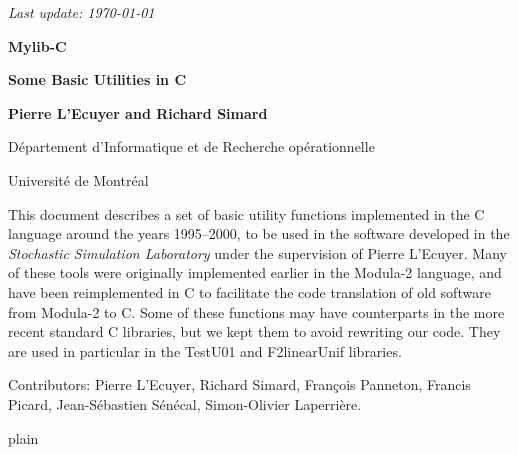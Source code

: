\documentclass[12pt]{article}
\begin{document}
\begin{titlepage}

\null 
\begin {flushright} \it Last update: \today \end {flushright}

\vfill
{ \centerline {\Large\bf Mylib-C }\bigskip\bigskip
  \centerline {\large\bf Some Basic Utilities in C }}
\vfill

\centerline {{\bf Pierre L'Ecuyer and Richard Simard}}
\medskip
\centerline {D\'epartement d'Informatique et de Recherche op\'erationnelle}
\centerline {Universit\'e de Montr\'eal}

\vfill
\medskip

This document describes a set of basic utility functions implemented in the 
C language around the years 1995--2000, to be used in the software developed in the
\emph{Stochastic Simulation Laboratory} under the supervision of Pierre L'Ecuyer.
Many of these tools were originally implemented earlier in the Modula-2 language,
and have been reimplemented in C to facilitate the code translation of old 
software from Modula-2 to C.  Some of these functions may have counterparts in
the more recent standard C libraries, but we kept them to avoid rewriting our code.
They are used in particular in the TestU01 and F2linearUnif libraries.

Contributors:  Pierre L'Ecuyer, Richard Simard, Fran\c cois Panneton,
Francis Picard, Jean-S\'ebastien S\'en\'ecal, Simon-Olivier Laperri\`ere.

\vfill
\end{titlepage}

\tableofcontents
{}

\iffalse 













\fi


\clearpage
\clearpage
\clearpage
\clearpage
\clearpage
\clearpage
\clearpage
\clearpage
\clearpage
\clearpage
\clearpage
\clearpage
\clearpage

\clearpage
 {plain}

\end{document}
